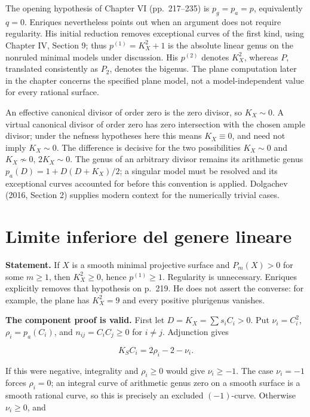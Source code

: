 The opening hypothesis of Chapter VI (pp.~217--235) is \(p_g=p_a=p\), equivalently \(q=0\). Enriques nevertheless points out when an argument does not require regularity. His initial reduction removes exceptional curves of the first kind, using Chapter IV, Section 9; thus \(p^{(1)}=K_X^2+1\) is the absolute linear genus on the nonruled minimal models under discussion. His \(p^{(2)}\) denotes \(K_X^2\), whereas \(P\), translated consistently as \(P_2\), denotes the bigenus. The plane computation later in the chapter concerns the specified plane model, not a model-independent value for every rational surface.

An effective canonical divisor of order zero is the zero divisor, so \(K_X\sim0\). A virtual canonical divisor of order zero has zero intersection with the chosen ample divisor; under the nefness hypotheses here this means \(K_X\equiv0\), and need not imply \(K_X\sim0\). The difference is decisive for the two possibilities \(K_X\sim0\) and \(K_X\not\sim0\), \(2K_X\sim0\). The genus of an arbitrary divisor remains its arithmetic genus \(p_a(D)=1+D(D+K_X)/2\); a singular model must be resolved and its exceptional curves accounted for before this convention is applied. Dolgachev (2016, Section 2) supplies modern context for the numerically trivial cases.

\section{Limite inferiore del genere lineare}
\label{cp1-vi-1}

\textbf{Statement.} If \(X\) is a smooth minimal projective surface and \(P_m(X)>0\) for some \(m\geq1\), then \(K_X^2\geq0\), hence \(p^{(1)}\geq1\). Regularity is unnecessary. Enriques explicitly removes that hypothesis on p.~219. He does not assert the converse: for example, the plane has \(K_X^2=9\) and every positive plurigenus vanishes.

\textbf{The component proof is valid.} First let \(D=K_X=\sum s_iC_i>0\). Put \(\nu_i=C_i^2\), \(\rho_i=p_a(C_i)\), and \(n_{ij}=C_iC_j\geq0\) for \(i\ne j\). Adjunction gives

\[
K_SC_i=2\rho_i-2-\nu_i.
\]

If this were negative, integrality and \(\rho_i\geq0\) would give \(\nu_i\geq-1\). The case \(\nu_i=-1\) forces \(\rho_i=0\); an integral curve of arithmetic genus zero on a smooth surface is a smooth rational curve, so this is precisely an excluded \((-1)\)-curve. Otherwise \(\nu_i\geq0\), and

